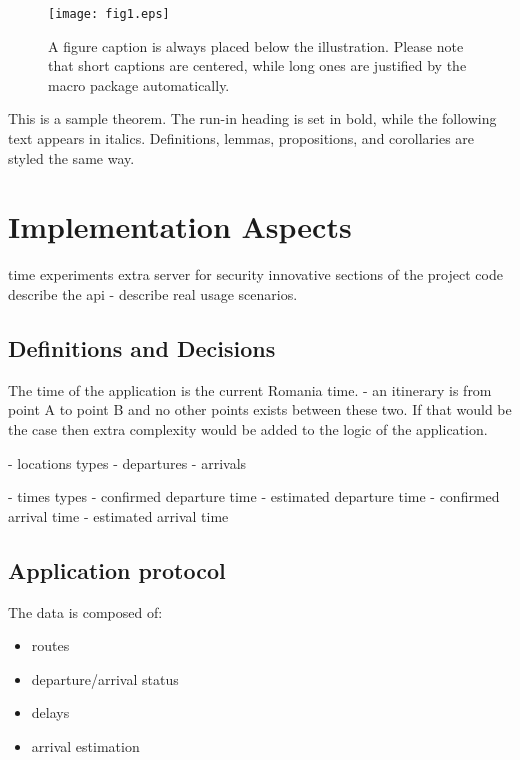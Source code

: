 \documentclass[runningheads]{llncs}
\begin{document}
    \begin{figure}
    \texttt{[image: fig1.eps]}
    \caption{A figure caption is always placed below the illustration.
    Please note that short captions are centered, while long ones are
    justified by the macro package automatically.} \label{fig1}
    \end{figure}
    
    \begin{theorem}
    This is a sample theorem. The run-in heading is set in bold, while
    the following text appears in italics. Definitions, lemmas,
    propositions, and corollaries are styled the same way.
    \end{theorem}
    

\section{Implementation Aspects}

time experiments
extra server for security
innovative sections of the project code 
describe the api - describe real usage scenarios.

\subsection{Definitions and Decisions}

The time of the application is the current Romania time.
- an itinerary is from point A to point B and no other points exists between these two. If that would be the case then extra complexity would be added to the logic of the application.

- locations types
    - departures
    - arrivals

- times types
    - confirmed departure time
    - estimated departure time
    - confirmed arrival time
    - estimated arrival time


\subsection{Application protocol}

The data is composed of:
\begin{itemize}
    \item routes
    \item departure/arrival status
    \item delays
    \item arrival estimation
\end{itemize}
\end{document}
